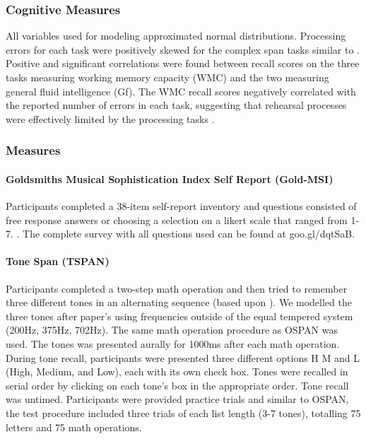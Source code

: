 \documentclass[]{book}
\let\oldparagraph\paragraph
\renewcommand{\paragraph}[1]{\oldparagraph{#1}\mbox{}}
\begin{document}
\hypertarget{cognitive-measures}{%
\subsubsection{Cognitive Measures}\label{cognitive-measures}}

All variables used for modeling approximated normal distributions.
Processing errors for each task were positively skewed for the complex span tasks similar to \citet{unsworthComplexWorkingMemory2009}.
Positive and significant correlations were found between recall scores on the three tasks measuring working memory capacity (WMC) and the two measuring general fluid intelligence (Gf).
The WMC recall scores negatively correlated with the reported number of errors in each task, suggesting that rehearsal processes were effectively limited by the processing tasks \citep{unsworthComplexWorkingMemory2009}.

\hypertarget{measures}{%
\subsubsection{Measures}\label{measures}}

\hypertarget{goldsmiths-musical-sophistication-index-self-report-gold-msi}{%
\paragraph{Goldsmiths Musical Sophistication Index Self Report (Gold-MSI)}\label{goldsmiths-musical-sophistication-index-self-report-gold-msi}}

Participants completed a 38-item self-report inventory and questions consisted of free response answers or choosing a
selection on a likert scale that ranged from 1-7. \citep{mullensiefenMusicalityNonMusiciansIndex2014}.
The complete survey with all questions used can be found at goo.gl/dqtSaB.

\hypertarget{tone-span-tspan}{%
\paragraph{Tone Span (TSPAN)}\label{tone-span-tspan}}

Participants completed a two-step math operation and then tried to remember three different tones in an alternating sequence (based upon \citet{unsworthAutomatedVersionOperation2005}).
We modelled the three tones after \citet{liEstimatingWorkingMemory2013} paper's using frequencies outside of the equal tempered system (200Hz, 375Hz, 702Hz).
The same math operation procedure as OSPAN was used.
The tones was presented aurally for 1000ms after each math operation.
During tone recall, participants were presented three different options H M and L (High, Medium, and Low), each with its own check box.
Tones were recalled in serial order by clicking on each tone's box in the appropriate order.
Tone recall was untimed.
Participants were provided practice trials and similar to OSPAN, the test procedure included three trials of each list length (3-7 tones), totalling 75 letters and 75 math operations.
\end{document}
